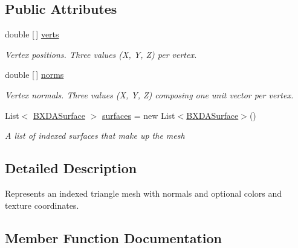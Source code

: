 \subsection*{Public Attributes}
\begin{DoxyCompactItemize}
\item 
double \mbox{[}$\,$\mbox{]} \hyperlink{class_b_x_d_a_mesh_1_1_b_x_d_a_sub_mesh_a9380db1d5b44c04010de0d21a9dac79e}{verts}
\begin{DoxyCompactList}\small\item\em Vertex positions. Three values (X, Y, Z) per vertex. \end{DoxyCompactList}\item 
double \mbox{[}$\,$\mbox{]} \hyperlink{class_b_x_d_a_mesh_1_1_b_x_d_a_sub_mesh_a098a0a069e7ed3e32caf3ca6bbfd752a}{norms}
\begin{DoxyCompactList}\small\item\em Vertex normals. Three values (X, Y, Z) composing one unit vector per vertex. \end{DoxyCompactList}\item 
List$<$ \hyperlink{class_b_x_d_a_mesh_1_1_b_x_d_a_surface}{B\+X\+D\+A\+Surface} $>$ \hyperlink{class_b_x_d_a_mesh_1_1_b_x_d_a_sub_mesh_a6b55f3c3beb64270a075b12cfa45143c}{surfaces} = new List$<$\hyperlink{class_b_x_d_a_mesh_1_1_b_x_d_a_surface}{B\+X\+D\+A\+Surface}$>$()
\begin{DoxyCompactList}\small\item\em A list of indexed surfaces that make up the mesh \end{DoxyCompactList}\end{DoxyCompactItemize}


\subsection{Detailed Description}
Represents an indexed triangle mesh with normals and optional colors and texture coordinates. 



\subsection{Member Function Documentation}
\mbox{\label{class_b_x_d_a_mesh_1_1_b_x_d_a_sub_mesh_a3f50b41f51136f7662730d2037875c11}} 
